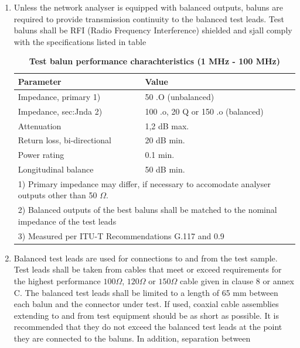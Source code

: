\begin{enumerate}
    \item {Unless the network analyser is equipped with balanced outputs, baluns are required to
    provide transmission continuity to the balanced test leads. Test baluns shall be RFI (Radio
    Frequency Interference) shielded and sjall comply with the specifications listed in table}
    \setcounter{table}{1}
    \begin{longtable}[c]{| p{4cm} | p{4cm} |}
        \caption{\bf Test balun performance charachteristics (1 MHz - 100 MHz)} \\
        \hline
        {\bf Parameter} & {\bf Value} \\
        \hline
        Impedance, primary 1) & 50 .O (unbalanced) \\
        \hline
        Impedance, sec:Jnda 2) & 100 .o, 20 Q or 150 .o (balanced) \\
        \hline
        Attenuation & 1,2 dB max. \\
        \hline
        Return loss, bi-directional & 20 dB min. \\
        \hline
        Power rating & 0.1 min. \\
        \hline
        Longitudinal balance & 50 dB min. \\
        \hline
        \multicolumn{2}{|p{8cm}|}{
            1) Primary impedance may differ, if necessary to accomodate analyser outputs other than 50 $\Omega$.
            }\\
            \multicolumn{2}{|p{8cm}|}{
            2) Balanced outputs of the best baluns shall be matched to the nominal impedance of the test leads
            }\\
            \multicolumn{2}{|p{8cm}|}{
            3) Measured per ITU-T Recommendations G.117 and 0.9
            }\\
        \hline
    \end{longtable}
    \item {Balanced test leads are used for connections to and from the test sample. Test leads shall
    be taken from cables that meet or exceed requirements for the highest performance $100 \Omega$, $120 \Omega$ or
    $150 \Omega$ cable given in clause 8 or annex C}. The balanced test leads shall be limited to a length of 65
    mm between each balun and the connector under test. If used, coaxial cable assemblies extending to
    and from test equipment should be as short as possible. It is recommended that they do not exceed
    the balanced test leads at the point they are connected to the baluns. In addition, separation between

\end{enumerate}

